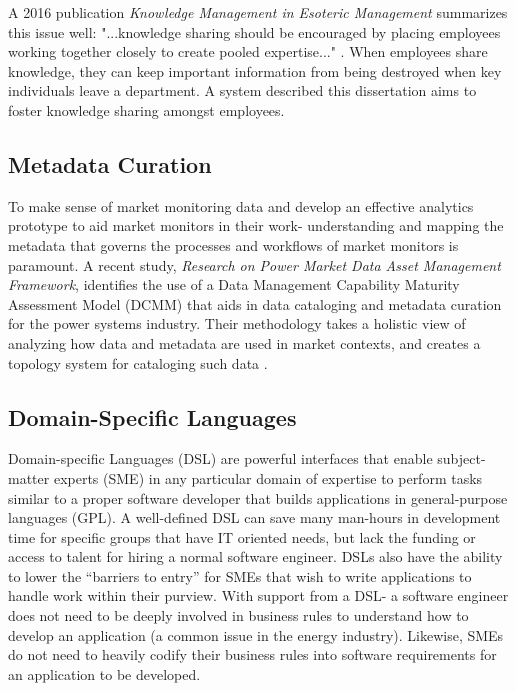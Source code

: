 A 2016 publication \textit{Knowledge Management in Esoteric Management} summarizes this issue well: "...knowledge sharing should be encouraged by placing employees working together closely to create pooled expertise..." \cite{knowledge-management-in-esoteric-management}. When employees share knowledge, they can keep important information from being destroyed when key individuals leave a department. A system described this dissertation aims to foster knowledge sharing amongst employees.

\subsection{Metadata Curation}

To make sense of market monitoring data and develop an effective analytics prototype to aid market monitors in their work- understanding and mapping the metadata that governs the processes and workflows of market monitors is paramount. A recent study, \textit{Research on Power Market Data Asset Management Framework}, identifies the use of a Data Management Capability Maturity Assessment Model (DCMM) that aids in data cataloging and metadata curation for the power systems industry. Their methodology takes a holistic view of analyzing how data and metadata are used in market contexts, and creates a topology system for cataloging such data \cite{marketdataasset}.

\subsection{Domain-Specific Languages}

Domain-specific Languages (DSL) are powerful interfaces that enable subject-matter experts (SME) in any particular domain of expertise to perform tasks similar to a proper software developer that builds applications in general-purpose languages (GPL). A well-defined DSL can save many man-hours in development time for specific groups that have IT oriented needs, but lack the funding or access to talent for hiring a normal software engineer. DSLs also have the ability to lower the “barriers to entry” for SMEs that wish to write applications to handle work within their purview. With support from a DSL- a software engineer does not need to be deeply involved in business rules to understand how to develop an application (a common issue in the energy industry). Likewise, SMEs do not need to heavily codify their business rules into software requirements for an application to be developed.

